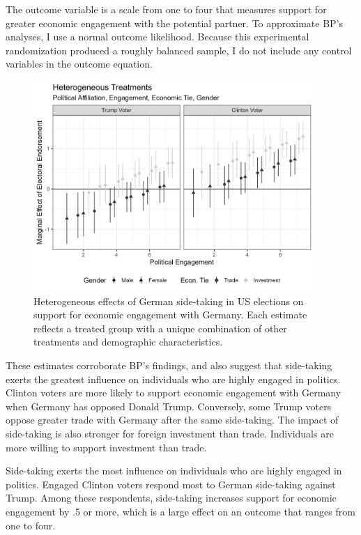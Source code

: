 \documentclass[12pt]{article}
\begin{document}
The outcome variable is a scale from one to four that measures support for greater economic engagement with the potential partner. 
To approximate BP's analyses, I use a normal outcome likelihood. 
Because this experimental randomization produced a roughly balanced sample, I do not include any control variables in the outcome equation. 


\begin{figure}[htpb]
	\centering
		\includegraphics[width=0.95\textwidth]{bp-het-est.png}
	\caption{Heterogeneous effects of German side-taking in US elections on support for economic engagement with Germany. Each estimate reflects a treated group with a unique combination of other treatments and demographic characteristics.}
	\label{fig:bp-het-est}
\end{figure}


These estimates corroborate BP's findings, and also suggest that side-taking exerts the greatest influence on individuals who are highly engaged in politics. 
Clinton voters are more likely to support economic engagement with Germany when Germany has opposed Donald Trump. 
Conversely, some Trump voters oppose greater trade with Germany after the same side-taking. 
The impact of side-taking is also stronger for foreign investment than trade. 
Individuals are more willing to support investment than trade.


Side-taking exerts the most influence on individuals who are highly engaged in politics. 
Engaged Clinton voters respond most to German side-taking against Trump. 
Among these respondents, side-taking increases support for economic engagement by .5 or more, which is a large effect on an outcome that ranges from one to four. 


\singlespace
 
 
\end{document}
